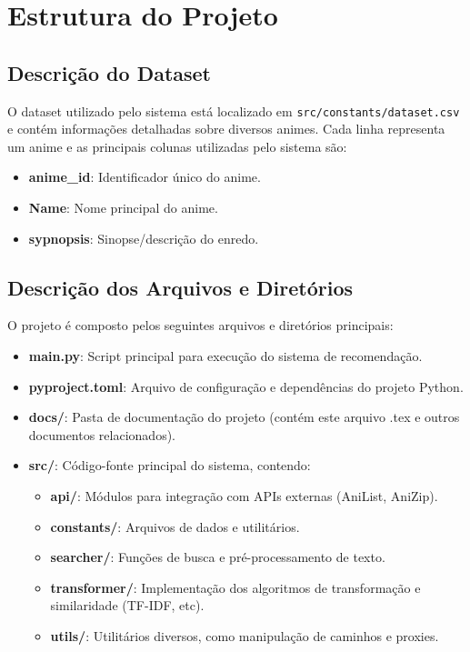 \documentclass{article}
\begin{document}
\section{Estrutura do Projeto}

\subsection*{Descrição do Dataset}
O dataset utilizado pelo sistema está localizado em \texttt{src/constants/dataset.csv} e contém informações detalhadas sobre diversos animes. Cada linha representa um anime e as principais colunas utilizadas pelo sistema são:
\begin{itemize}
    \item \textbf{anime\_id}: Identificador único do anime.
    \item \textbf{Name}: Nome principal do anime.
    \item \textbf{sypnopsis}: Sinopse/descrição do enredo.
\end{itemize}



\subsection*{Descrição dos Arquivos e Diretórios}
O projeto é composto pelos seguintes arquivos e diretórios principais:
\begin{itemize}
    \item \textbf{main.py}: Script principal para execução do sistema de recomendação.
    \item \textbf{pyproject.toml}: Arquivo de configuração e dependências do projeto Python.
    \item \textbf{docs/}: Pasta de documentação do projeto (contém este arquivo .tex e outros documentos relacionados).
    \item \textbf{src/}: Código-fonte principal do sistema, contendo:
    \begin{itemize}
        \item \textbf{api/}: Módulos para integração com APIs externas (AniList, AniZip).
        \item \textbf{constants/}: Arquivos de dados e utilitários.
        \item \textbf{searcher/}: Funções de busca e pré-processamento de texto.
        \item \textbf{transformer/}: Implementação dos algoritmos de transformação e similaridade (TF-IDF, etc).
        \item \textbf{utils/}: Utilitários diversos, como manipulação de caminhos e proxies.
    \end{itemize}
\end{itemize}
\end{document}
